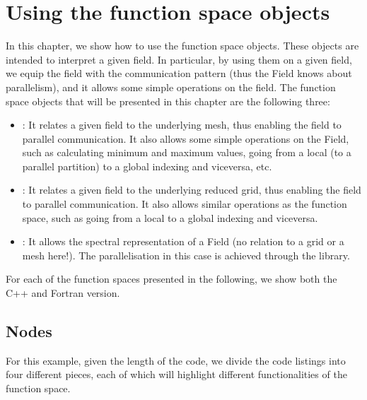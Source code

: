 \chapter{Using the function space objects}
In this chapter, we show how to use the function space 
objects. These objects are intended to interpret a 
given field. In particular, by using them on a given 
field, we equip the field with the communication pattern 
(thus the Field knows about parallelism), and it allows 
some simple operations on the field. The function space 
objects that will be presented in this chapter are the 
following three:
%
\begin{itemize}
\item {}: It relates a given field to the underlying 
mesh, thus enabling the field to parallel communication. 
It also allows some simple operations on the Field, such 
as calculating minimum and maximum values, going from a 
local (to a parallel partition) to a global indexing and 
viceversa, etc.
\item {}: It relates 
a given field to the underlying reduced grid, thus enabling 
the field to parallel communication. It also allows similar 
operations as the  function space, such as going 
from a local to a global indexing and viceversa.
\item {}: It allows the spectral representation 
of a Field (no relation to a grid or a mesh here!). The 
parallelisation in this case is achieved through the  
library.
\end{itemize}
%
For each of the function spaces presented in the following, 
we show both the C++ and Fortran version. 

\section{Nodes}
For this example, given the length of the code, we divide the code
listings into four different pieces, each of which will highlight 
different functionalities of the function space.

